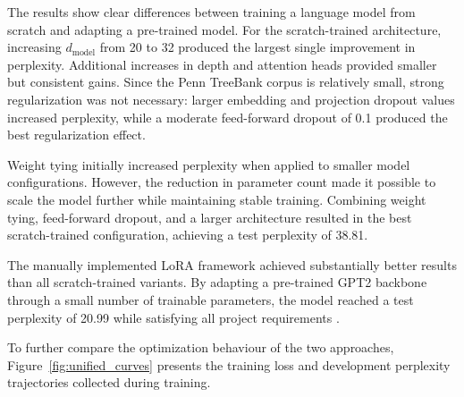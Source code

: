 \begin{table}[H]
\centering
\small
\caption{LoRA fine-tuning parameters and perplexity metrics for Part 1.B.}
\label{tab:1b_results}

\end{table}
The results show clear differences between training a language model from scratch and adapting a pre-trained model. For the scratch-trained architecture, increasing $d_{\text{model}}$ from 20 to 32 produced the largest single improvement in perplexity. Additional increases in depth and attention heads provided smaller but consistent gains. Since the Penn TreeBank corpus is relatively small, strong regularization was not necessary: larger embedding and projection dropout values increased perplexity, while a moderate feed-forward dropout of 0.1 produced the best regularization effect.

Weight tying \cite{press2016using} initially increased perplexity when applied to smaller model configurations. However, the reduction in parameter count made it possible to scale the model further while maintaining stable training. Combining weight tying, feed-forward dropout, and a larger architecture resulted in the best scratch-trained configuration, achieving a test perplexity of 38.81.

The manually implemented LoRA framework achieved substantially better results than all scratch-trained variants. By adapting a pre-trained GPT2 backbone \cite{radford2019language} through a small number of trainable parameters, the model reached a test perplexity of 20.99 while satisfying all project requirements \cite{hu2021lora}.

To further compare the optimization behaviour of the two approaches, Figure~\ref{fig:unified_curves} presents the training loss and development perplexity trajectories collected during training.

